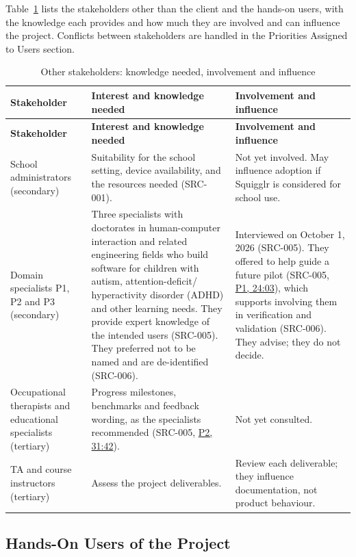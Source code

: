 \documentclass[12pt]{article}
\renewcommand{\_}{\textunderscore\allowbreak}%
\newcommand{\intlink}[3]{\hyperref[int:#1-#2]{#3}}
\newcommand{\intref}[2]{\intlink{#1}{#2}{#1, #2}}
\begin{document}
Table~\ref{tab:otherStakeholders} lists the stakeholders other than the client
and the hands-on users, with the knowledge each provides and how much they are
involved and can influence the project. Conflicts between stakeholders are
handled in the Priorities Assigned to Users section.

{\small
\begin{longtable}{@{}>{\raggedright\arraybackslash}p{}>{\raggedright\arraybackslash}p{}>{\raggedright\arraybackslash}p{}@{}}
\caption{Other stakeholders: knowledge needed, involvement and influence}
\label{tab:otherStakeholders}\\
\toprule
\textbf{Stakeholder} & \textbf{Interest and knowledge needed} &
\textbf{Involvement and influence} \\
\midrule
\endfirsthead
\toprule
\textbf{Stakeholder} & \textbf{Interest and knowledge needed} &
\textbf{Involvement and influence} \\
\midrule
\endhead
\bottomrule
\endlastfoot
School administrators (secondary) & Suitability for the school setting, device
availability, and the resources needed (SRC-001). & Not yet involved. May
influence adoption if Squigglr is considered for school use. \\
Domain specialists P1, P2 and P3 (secondary) & Three specialists with doctorates
in human-computer interaction and related engineering fields who build software
for children with autism, attention-deficit/%
hyperactivity disorder (ADHD) and other learning needs. They provide expert
knowledge of the intended users (SRC-005). They preferred not to be named and
are de-identified (SRC-006). & Interviewed on October 1, 2026 (SRC-005). They
offered to help guide a future pilot (SRC-005, \intref{P1}{24:03}), which
supports involving them in verification and validation (SRC-006). They advise;
they do not decide. \\
Occupational therapists and educational specialists (tertiary) & Progress
milestones, benchmarks and feedback wording, as the specialists recommended
(SRC-005, \intref{P2}{31:42}). & Not yet consulted. \\
TA and course instructors (tertiary) & Assess the project deliverables. & Review
each deliverable; they influence documentation, not product behaviour. \\
\end{longtable}
}

\subsection{Hands-On Users of the Project}
\end{document}
